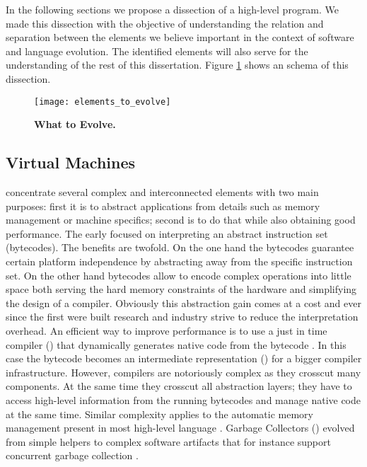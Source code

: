 In the following sections we propose a dissection of a high-level program. We made this dissection with the objective of understanding the relation and separation between the elements we believe important in the context of software and language evolution. The identified elements will also serve for the understanding of the rest of this dissertation. Figure \ref{fig:whatToEvolve} shows an schema of this dissection.

\begin{figure}[!ht]
\begin{center}
\texttt{[image: elements\_to\_evolve]}
\caption{\textbf{What to Evolve.}\label{fig:whatToEvolve}}
\end{center}
\end{figure}



\subsection{Virtual Machines}

\VMs concentrate several complex and interconnected elements with two main purposes: first it is to abstract applications from details such as memory management or machine specifics; second is to do that while also obtaining good performance.
The early \VMs focused on interpreting an abstract instruction set (bytecodes).
The benefits are twofold.
On the one hand the bytecodes guarantee certain platform independence by abstracting away from the \CPU specific instruction set.
On the other hand bytecodes allow to encode complex operations into little space both serving the hard memory constraints of the hardware and simplifying the design of a compiler.
Obviously this abstraction gain comes at a cost and ever since the first \VMs were built research and industry strive to reduce the interpretation overhead.
An efficient way to improve performance is to use a just in time compiler (\JIT) that dynamically generates native code from the bytecode \cite{Deut84a}.
In this case the bytecode becomes an intermediate representation (\IR) for a bigger compiler infrastructure.
However, \JIT compilers are notoriously complex as they crosscut many \VM components.
At the same time they crosscut all abstraction layers; they have to access high-level information from the running bytecodes and manage native code at the same time.
Similar complexity applies to the automatic memory management present in most high-level language \VMs.
Garbage Collectors (\GC) evolved from simple helpers to complex software artifacts that for instance support concurrent garbage collection \cite{Clic05a}.

